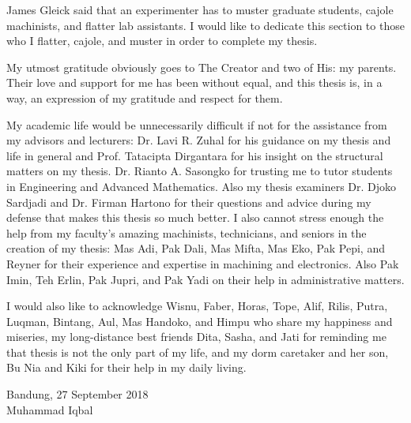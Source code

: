 James Gleick said that an experimenter has to muster graduate students, cajole machinists, and flatter lab assistants. I would like to dedicate this section to those who I flatter, cajole, and muster in order to complete my thesis.\par
My utmost gratitude obviously goes to The Creator and two of His: my parents. Their love and support for me has been without equal, and this thesis is, in a way, an expression of my gratitude and respect for them.\par
My academic life would be unnecessarily difficult if not for the assistance from my advisors and lecturers: Dr. Lavi R. Zuhal for his guidance on my thesis and life in general and Prof. Tatacipta Dirgantara for his insight on the structural matters on my thesis. Dr. Rianto A. Sasongko for trusting me to tutor students in Engineering and Advanced Mathematics. Also my thesis examiners Dr. Djoko Sardjadi and Dr. Firman Hartono for their questions and advice during my defense that makes this thesis so much better. I also cannot stress enough the help from my faculty's amazing machinists, technicians, and seniors in the creation of my thesis: Mas Adi, Pak Dali, Mas Mifta, Mas Eko, Pak Pepi, and Reyner for their experience and expertise in machining and electronics. Also Pak Imin, Teh Erlin, Pak Jupri, and Pak Yadi on their help in administrative matters.\par
I would also like to acknowledge Wisnu, Faber, Horas, Tope, Alif, Rilis, Putra, Luqman, Bintang, Aul, Mas Handoko, and Himpu who share my happiness and miseries, my long-distance best friends Dita, Sasha, and Jati for reminding me that thesis is not the only part of my life, and my dorm caretaker and her son, Bu Nia and Kiki for their help in my daily living.\par
\begin{minipage}{1.0\linewidth}
\begin{flushright}                                      
Bandung, 27 September 2018 \\ [2cm]
Muhammad Iqbal
\end{flushright} 
\end{minipage}